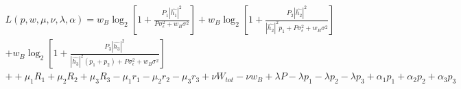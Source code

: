 \documentclass[preview]{standalone}
\begin{document}
\begin{align*}
L(p, w, \mu, \nu, \lambda, \alpha) = w_B \log_2 \left[1 + \frac{P_1 \left|\hat{h_1}\right|^2}{P \sigma_{\epsilon}^2 + w_B \sigma^2}\right] + w_B \log_2 \left[1 + \frac{P_2 \left|\hat{h_2}\right|^2}{\left|\hat{h_2}\right|^2 p_1 + P \sigma_{\epsilon}^2 + w_B \sigma^2}\right] \\ + w_B \log_2 \left[1 + \frac{P_3 \left|\hat{h_3}\right|^2}{\left|\hat{h_3}\right|^2 (p_1 + p_2) + P \sigma_{\epsilon}^2 + w_B \sigma^2}\right] \\ + + \mu_1 R_1 + \mu_2 R_2 + \mu_3 R_3 - \mu_1 r_1 - \mu_2 r_2 - \mu_3 r_3 + \nu W_{tot} - \nu w_B + \lambda P - \lambda p_1 - \lambda p_2 - \lambda p_3 + \alpha_1 p_1 + \alpha_2 p_2 + \alpha_3 p_3
\end{align*}
\end{document}
